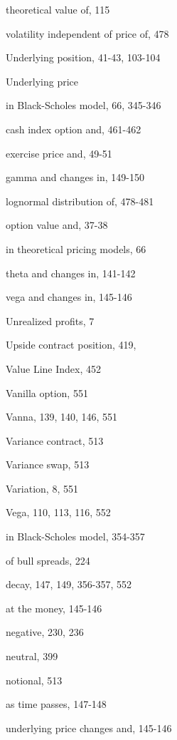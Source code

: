 \noindent theoretical value of, 115\par
\noindent volatility independent of price of, 478\par
\noindent Underlying position, 41-43, 103-104\par
\noindent Underlying price\par
\noindent in Black-Scholes model, 66, 345-346\par
\noindent cash index option and, 461-462\par
\noindent exercise price and, 49-51\par
\noindent gamma and changes in, 149-150\par
\noindent lognormal distribution of, 478-481\par
\noindent option value and, 37-38\par
\noindent in theoretical pricing models, 66\par
\noindent theta and changes in, 141-142\par
\noindent vega and changes in, 145-146\par
\noindent Unrealized profits, 7\par
Upside contract position, 419,\par
\noindent Value Line Index, 452\par
\noindent Vanilla option, 551\par
\noindent Vanna, 139, 140, 146, 551\par
\noindent Variance contract, 513\par
\noindent Variance swap, 513\par
\noindent Variation, 8, 551\par
\noindent Vega, 110, 113, 116, 552\par
\noindent in Black-Scholes model, 354-357\par
\noindent of bull spreads, 224\par
\noindent decay, 147, 149, 356-357, 552\par
\noindent at the money, 145-146\par
\noindent negative, 230, 236\par
\noindent neutral, 399\par
\noindent notional, 513\par
\noindent as time passes, 147-148\par
\noindent underlying price changes and, 145-146\par

